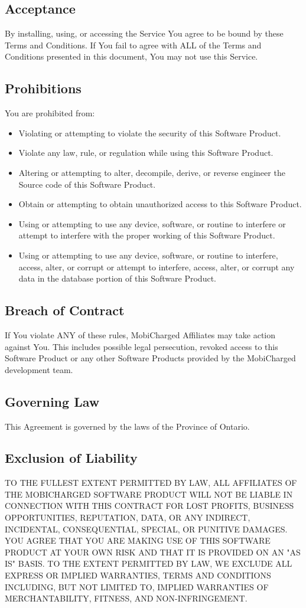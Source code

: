 \documentclass[12pt, titlepage]{article}
\begin{document}
\subsection{Acceptance}
By installing, using, or accessing the Service You agree to be bound by these Terms and Conditions. If You fail to agree with ALL of the Terms and Conditions presented in this document, You may not use this Service.

\subsection{Prohibitions}
You are prohibited from:
\begin{itemize}
    \item Violating or attempting to violate the security of this Software Product.
    \item Violate any law, rule, or regulation while using this Software Product.
    \item Altering or attempting to alter, decompile, derive, or reverse engineer the Source code of this Software Product.
    \item Obtain or attempting to obtain unauthorized access to this Software Product.
    \item Using or attempting to use any device, software, or routine to interfere or attempt to interfere with the proper working of this Software Product. 
    \item Using or attempting to use any device, software, or routine to interfere, access, alter, or corrupt or attempt to interfere, access, alter, or corrupt any data in the database portion of this Software Product.
\end{itemize}
\subsection{Breach of Contract}
If You violate ANY of these rules, MobiCharged Affiliates may take action against You. This includes possible legal persecution, revoked access to this Software Product or any other Software Products provided by the MobiCharged development team. 

\subsection{Governing Law}
This Agreement is governed by the laws of the Province of Ontario.
\subsection{Exclusion of Liability}
TO THE FULLEST EXTENT PERMITTED BY LAW, ALL AFFILIATES OF THE MOBICHARGED SOFTWARE PRODUCT WILL NOT BE LIABLE IN CONNECTION WITH THIS CONTRACT FOR LOST PROFITS, BUSINESS OPPORTUNITIES, REPUTATION, DATA, OR ANY INDIRECT, INCIDENTAL, CONSEQUENTIAL, SPECIAL, OR PUNITIVE DAMAGES.
YOU AGREE THAT YOU ARE MAKING USE OF THIS SOFTWARE PRODUCT AT YOUR OWN RISK AND THAT IT IS PROVIDED ON AN "AS IS" BASIS. TO THE EXTENT PERMITTED BY LAW, WE EXCLUDE ALL EXPRESS OR IMPLIED WARRANTIES, TERMS AND CONDITIONS INCLUDING, BUT NOT LIMITED TO, IMPLIED WARRANTIES OF MERCHANTABILITY, FITNESS, AND NON-INFRINGEMENT.
\end{document}
